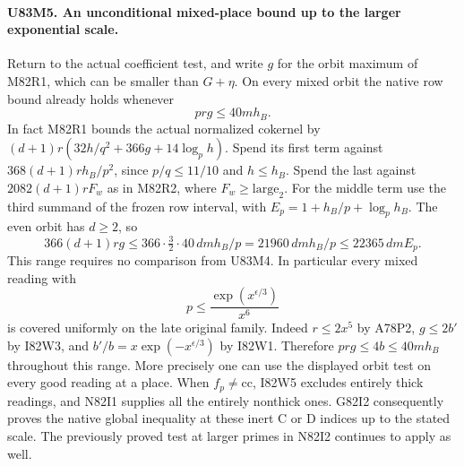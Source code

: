 \paragraph{U83M5. An unconditional mixed-place bound up to the larger exponential scale.}
Return to the actual coefficient test, and write $g$ for the
orbit maximum of M82R1, which can be smaller than $G+\eta$.
On every mixed orbit the native row bound already holds whenever
\[
                 p r g\le40m h_B .
\]
In fact M82R1 bounds the actual normalized cokernel by
$(d+1)r(32h/q^2+366g+14\log_p h)$. Spend its first term against
$368(d+1)rh_B/p^2$, since $p/q\le11/10$ and $h\le h_B$.
Spend the last against $2082(d+1)rF_w$ as in M82R2, where
$F_w\ge\mathrm{large}_2$. For the middle term use the third
summand of the frozen row interval, with
$E_p=1+h_B/p+\log_p h_B$. The even orbit has $d\ge2$, so
\[
 366(d+1)rg\le366\cdot\tfrac32\cdot40\,dmh_B/p
       =21960\,dmh_B/p\le22365\,dm E_p .
\]
This range requires no comparison from
U83M4. In particular every mixed reading with
\[
                   p\le \frac{\exp(x^{\epsilon/3})}{x^6}
\]
is covered uniformly on the late original family. Indeed
$r\le2x^5$ by A78P2, $g\le2b'$ by I82W3, and
$b'/b=x\exp(-x^{\epsilon/3})$ by I82W1. Therefore
$prg\le4b\le40m h_B$ throughout this range. More precisely
one can use the displayed orbit test on every good reading at
a place. When $f_p\ne\mathrm{cc}$, I82W5 excludes entirely
thick readings, and N82I1 supplies all the entirely nonthick
ones. G82I2 consequently proves the native global inequality at
these inert C or D indices up to the stated scale. The previously
proved test at larger primes in N82I2 continues to apply as well.

